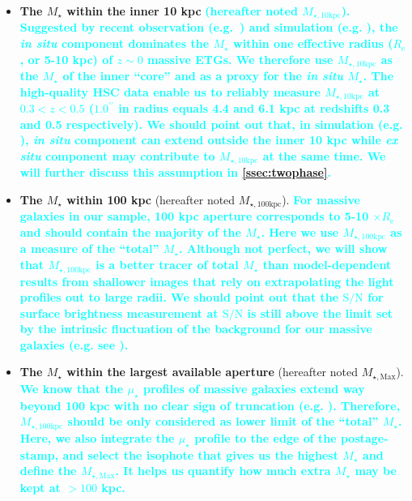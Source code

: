 \documentclass[a4paper,fleqn,usenatbib]{mnras}
\def\arcsec{{\prime\prime}}
\def\mstar{{$M_{\star}$}}
\def\minn{{$M_{\star,10\mathrm{kpc}}$}}
\def\mtot{{$M_{\star,100\mathrm{kpc}}$}}
\def\mmax{{$M_{\star,\mathrm{Max}}$}}
\def\s2n{{$\mathrm{S}/\mathrm{N}$}}
\def\mden{{$\mu_{\star}$}}
\newcommand{\song}[1]{\textcolor{cyan}{\textbf{#1}}}
\begin{document}
    \begin{itemize} 
       
        \item \textbf{The \mstar{} within the inner 10 kpc} 
            \song{
            (hereafter noted \minn{}). 
            Suggested by recent observation (e.g.~\citealt{vanDokkum2010}) and 
            simulation (e.g. \citealt{RodriguezGomez2016}), the \textit{in situ} 
            component dominates the \mstar{} within one effective radius 
            ($R_{\mathrm{e}}$, or 5-10 kpc) of $z{\sim}0$ massive ETGs.
            We therefore use \minn{} as the \mstar{} of the inner ``core'' and as 
            a proxy for the \textit{in situ} \mstar{}. 
            The high-quality HSC data enable us to reliably measure \minn{} at 
            $0.3 < z < 0.5$ ($1.0^{\arcsec}$ in radius equals 4.4 and 6.1 kpc 
            at redshifts 0.3 and 0.5 respectively).
            We should point out that, in simulation 
            (e.g. \citealt{RodriguezGomez2016}), \textit{in situ} component can 
            extend outside the inner 10 kpc while \textit{ex situ} component may 
            contribute to \minn{} at the same time.  
            We will further discuss this assumption in \ref{ssec:twophase}.
            }
            
        \item \textbf{The \mstar{} within 100 kpc} 
            (hereafter noted \mtot{}). 
            \song{
            For massive galaxies in our sample, 100 kpc aperture corresponds to 5-10 
            $\times R_{\mathrm{e}}$ and should contain the majority of the \mstar{}. 
            Here we use \mtot{} as a measure of the ``total'' \mstar{}. 
            Although not perfect, we will show that \mtot{} is a better tracer 
            of total \mstar{} than model-dependent results from shallower images 
            that rely on extrapolating the light profiles out to large radii. 
            We should point out that the \s2n{} for surface brightness measurement 
            at \s2n{} is still above the limit set by the intrinsic fluctuation 
            of the background for our massive galaxies (e.g. see \citealt{Pohlen2006}). 
            }
            
        \item \textbf{The \mstar{} within the largest available aperture} 
            (hereafter noted \mmax{}).
            \song{
            We know that the \mden{} profiles of massive galaxies extend way beyond 
            100 kpc with no clear sign of truncation
            (e.g. \citealt{Gonzalez2005, Tal2011, DSouza2014}).
            Therefore, \mtot{} should be only considered as lower limit of the
            ``total'' \mstar{}. 
            Here, we also integrate the \mden{} profile to the edge of the 
            postage-stamp, and select the isophote that gives us the highest  
            \mstar{} and define the \mmax{}. 
            It helps us quantify how much extra \mstar{} may be kept at $>100$ kpc.
            }
            
    \end{itemize}
       
\end{document}
